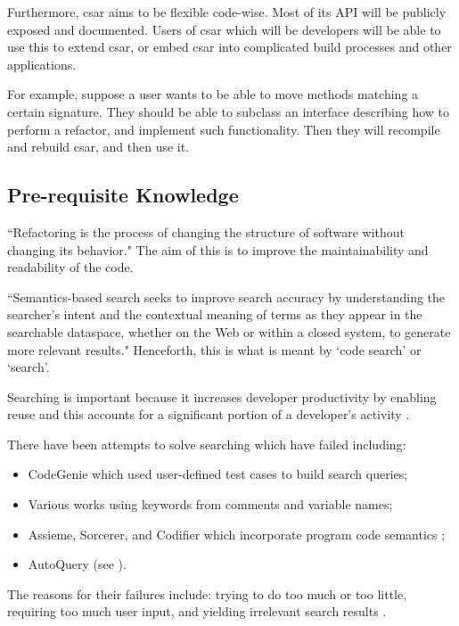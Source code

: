 \documentclass[12pt, letterpaper]{article}
\begin{document}
Furthermore, csar aims to be flexible code-wise.
Most of its API will be publicly exposed and documented.
Users of csar which will be developers will be able to use this to extend csar, or embed csar into complicated build processes and other applications.

For example, suppose a user wants to be able to move methods matching a certain signature.
They should be able to subclass an interface describing how to perform a refactor, and implement such functionality.
Then they will recompile and rebuild csar, and then use it.

\subsection{Pre-requisite Knowledge}
``Refactoring is the process of changing the structure of software without changing its behavior." \autocite{murphy2012we} The aim of this is to improve the maintainability and readability of the code.

``Semantics-based search seeks to improve search accuracy by understanding the searcher's intent and the contextual meaning of terms as they appear in the searchable dataspace, whether on the Web or within a closed system, to generate more relevant results." \autocite{wikipediasemanticsearch} Henceforth, this is what is meant by `code search' or `search'.

Searching is important because it increases developer productivity by enabling reuse and this accounts for a significant portion of a developer's activity \autocite{reiss2009semantics,stolee2014solving}.

There have been attempts to solve searching which have failed including:
\begin{itemize}
  \item CodeGenie which used user-defined test cases to build search queries;
  \item Various works using keywords from comments and variable names;
  \item Assieme, Sorcerer, and Codifier which incorporate program code semantics \autocite{reiss2009semantics};
  \item AutoQuery (see ).
\end{itemize}

The reasons for their failures include: trying to do too much or too little, requiring too much user input, and yielding irrelevant search results \autocite{reiss2009semantics,stolee2014solving}.
\end{document}
